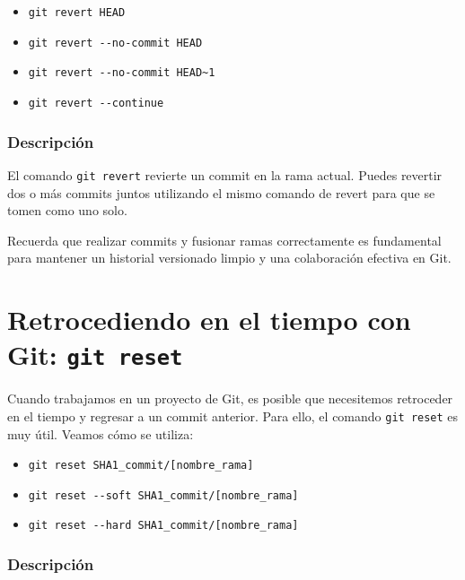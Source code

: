 \documentclass[
  letterpaper,
  DIV=11,
  numbers=noendperiod]{scrartcl}
\providecommand{\tightlist}{%
  \setlength{\itemsep}{0pt}\setlength{\parskip}{0pt}}\usepackage{longtable,booktabs,array}
\begin{document}
\begin{itemize}
\tightlist
\item
  \texttt{git\ revert\ HEAD}
\item
  \texttt{git\ revert\ -\/-no-commit\ HEAD}
\item
  \texttt{git\ revert\ -\/-no-commit\ HEAD\textasciitilde{}1}
\item
  \texttt{git\ revert\ -\/-continue}
\end{itemize}

\hypertarget{descripciuxf3n-1}{%
\subsubsection{Descripción}\label{descripciuxf3n-1}}

El comando \texttt{git\ revert} revierte un commit en la rama actual.
Puedes revertir dos o más commits juntos utilizando el mismo comando de
revert para que se tomen como uno solo.

Recuerda que realizar commits y fusionar ramas correctamente es
fundamental para mantener un historial versionado limpio y una
colaboración efectiva en Git.

\hypertarget{retrocediendo-en-el-tiempo-con-git-git-reset}{%
\section{\texorpdfstring{Retrocediendo en el tiempo con Git:
\texttt{git\ reset}}{Retrocediendo en el tiempo con Git: git reset}}\label{retrocediendo-en-el-tiempo-con-git-git-reset}}

Cuando trabajamos en un proyecto de Git, es posible que necesitemos
retroceder en el tiempo y regresar a un commit anterior. Para ello, el
comando \texttt{git\ reset} es muy útil. Veamos cómo se utiliza:

\begin{itemize}
\item
  \texttt{git\ reset\ SHA1\_commit/{[}nombre\_rama{]}}
\item
  \texttt{git\ reset\ -\/-soft\ SHA1\_commit/{[}nombre\_rama{]}}
\item
  \texttt{git\ reset\ -\/-hard\ SHA1\_commit/{[}nombre\_rama{]}}
\end{itemize}

\hypertarget{descripciuxf3n-2}{%
\subsubsection{Descripción}\label{descripciuxf3n-2}}
\end{document}
